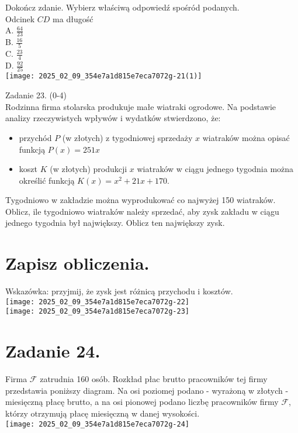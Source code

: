 \documentclass[10pt]{article}
\begin{document}
Dokończ zdanie. Wybierz właściwą odpowiedź spośród podanych.\\
Odcinek \(C D\) ma długość\\
A. \(\frac{64}{23}\)\\
B. \(\frac{16}{5}\)\\
C. \(\frac{23}{4}\)\\
D. \(\frac{92}{25}\)\\
\texttt{[image: 2025\_02\_09\_354e7a1d815e7eca7072g-21(1)]}

Zadanie 23. (0-4)\\
Rodzinna firma stolarska produkuje małe wiatraki ogrodowe. Na podstawie analizy rzeczywistych wpływów i wydatków stwierdzono, że:

\begin{itemize}
  \item przychód \(P\) (w złotych) z tygodniowej sprzedaży \(x\) wiatraków można opisać funkcją \(P(x)=251 x\)
  \item koszt \(K\) (w złotych) produkcji \(x\) wiatraków w ciągu jednego tygodnia można określić funkcją \(K(x)=x^{2}+21 x+170\).
\end{itemize}

Tygodniowo w zakładzie można wyprodukować co najwyżej 150 wiatraków.\\
Oblicz, ile tygodniowo wiatraków należy sprzedać, aby zysk zakładu w ciągu jednego tygodnia był największy. Oblicz ten największy zysk.

\section*{Zapisz obliczenia.}
Wskazówka: przyjmij, że zysk jest różnicą przychodu i kosztów.\\
\texttt{[image: 2025\_02\_09\_354e7a1d815e7eca7072g-22]}\\
\texttt{[image: 2025\_02\_09\_354e7a1d815e7eca7072g-23]}

\section*{Zadanie 24.}
Firma \(\mathcal{F}\) zatrudnia 160 osób. Rozkład płac brutto pracowników tej firmy przedstawia poniższy diagram. Na osi poziomej podano - wyrażoną w złotych - miesięczną płacę brutto, a na osi pionowej podano liczbę pracowników firmy \(\mathcal{F}\), którzy otrzymują płacę miesięczną w danej wysokości.\\
\texttt{[image: 2025\_02\_09\_354e7a1d815e7eca7072g-24]}
\end{document}
